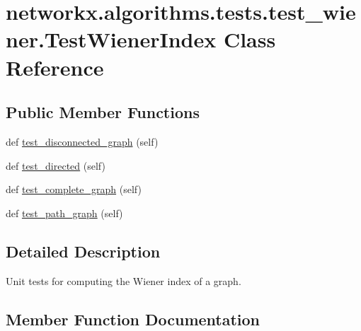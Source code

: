 \hypertarget{classnetworkx_1_1algorithms_1_1tests_1_1test__wiener_1_1TestWienerIndex}{}\section{networkx.\+algorithms.\+tests.\+test\+\_\+wiener.\+Test\+Wiener\+Index Class Reference}
\label{classnetworkx_1_1algorithms_1_1tests_1_1test__wiener_1_1TestWienerIndex}
\subsection*{Public Member Functions}
\begin{DoxyCompactItemize}
\item 
def \hyperlink{classnetworkx_1_1algorithms_1_1tests_1_1test__wiener_1_1TestWienerIndex_a17115df2302f232be2d162c4a348ae2f}{test\+\_\+disconnected\+\_\+graph} (self)
\item 
def \hyperlink{classnetworkx_1_1algorithms_1_1tests_1_1test__wiener_1_1TestWienerIndex_a5b1bb668cf318c7fb6f019358d93d3f4}{test\+\_\+directed} (self)
\item 
def \hyperlink{classnetworkx_1_1algorithms_1_1tests_1_1test__wiener_1_1TestWienerIndex_ab7b96a24ec0e784ba6a2c1e4af0e8b1b}{test\+\_\+complete\+\_\+graph} (self)
\item 
def \hyperlink{classnetworkx_1_1algorithms_1_1tests_1_1test__wiener_1_1TestWienerIndex_aa2ad865a5f1b7fad15342aa87a61dd63}{test\+\_\+path\+\_\+graph} (self)
\end{DoxyCompactItemize}


\subsection{Detailed Description}
\begin{DoxyVerb}Unit tests for computing the Wiener index of a graph.\end{DoxyVerb}
 

\subsection{Member Function Documentation}
\mbox{\label{classnetworkx_1_1algorithms_1_1tests_1_1test__wiener_1_1TestWienerIndex_ab7b96a24ec0e784ba6a2c1e4af0e8b1b}} 
